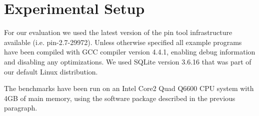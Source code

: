 \section{Experimental Setup}
For our evaluation we used the latest version of the pin tool
infrastructure available (i.e. pin-2.7-29972). Unless otherwise
specified all example programs have been compiled with GCC compiler
version 4.4.1, enabling debug information and disabling any
optimizations. We used SQLite version 3.6.16 that was part of our
default Linux distribution.

The benchmarks have been run on an Intel Core2 Quad Q6600 CPU system
with 4GB of main memory, using the software package described in the
previous paragraph.
